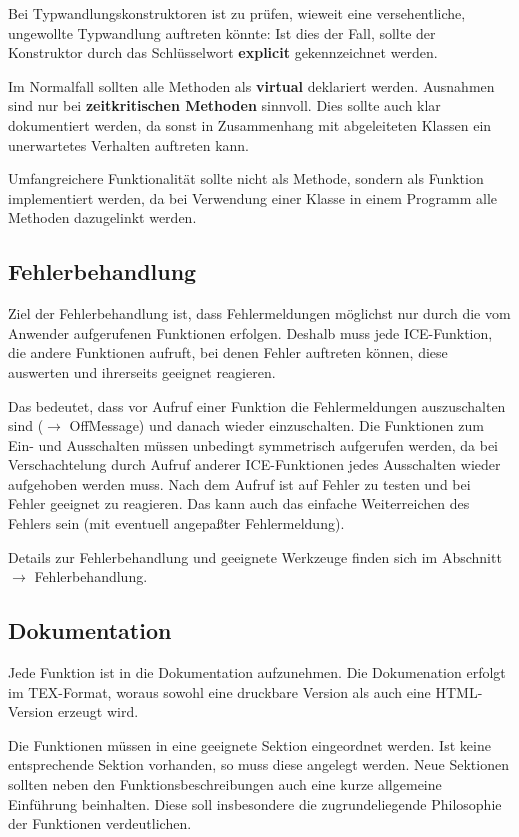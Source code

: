 \documentclass[10pt,titlepage]{article}
\def\see#1{$\to$ #1}
\begin{document}
{{Bei Typwandlungskonstruktoren ist zu prüfen, wieweit eine versehentliche,
ungewollte Typwandlung auftreten könnte: Ist dies der Fall, sollte der 
Konstruktor durch das Schlüsselwort {\bf explicit} gekennzeichnet werden.

Im Normalfall sollten alle Methoden als {\bf virtual} deklariert
werden. Ausnahmen sind nur bei {\bf zeitkritischen Methoden}
sinnvoll. Dies sollte auch klar dokumentiert werden, da sonst in 
Zusammenhang mit abgeleiteten Klassen ein unerwartetes Verhalten 
auftreten kann.

Umfangreichere Funktionalität sollte nicht als Methode, sondern als Funktion
implementiert werden, da bei Verwendung einer Klasse in einem Programm alle
Methoden dazugelinkt werden.

\subsection{Fehlerbehandlung}
Ziel der Fehlerbehandlung ist, dass Fehlermeldungen möglichst nur durch die
vom Anwender aufgerufenen Funktionen erfolgen. Deshalb muss jede ICE-Funktion,
die andere Funktionen aufruft, bei denen Fehler auftreten können, diese
auswerten und ihrerseits geeignet reagieren.

Das bedeutet, dass vor Aufruf einer Funktion die Fehlermeldungen auszuschalten
sind (\see{OffMessage}) und danach wieder einzuschalten. Die Funktionen zum
Ein- und Ausschalten müssen unbedingt symmetrisch aufgerufen werden, da bei 
Verschachtelung durch Aufruf anderer ICE-Funktionen jedes Ausschalten 
wieder aufgehoben werden muss. 
Nach dem Aufruf ist auf Fehler zu testen und bei Fehler geeignet zu 
reagieren. Das kann auch das einfache Weiterreichen des Fehlers sein 
(mit eventuell angepaßter Fehlermeldung).

Details zur Fehlerbehandlung und geeignete Werkzeuge finden sich im Abschnitt
\see{Fehlerbehandlung}.

\subsection{Dokumentation}
Jede Funktion ist in die Dokumentation aufzunehmen. Die Dokumenation erfolgt
im TEX-Format, woraus sowohl eine druckbare Version als auch eine HTML-Version
erzeugt wird.

Die Funktionen müssen in eine geeignete Sektion eingeordnet werden. Ist keine
entsprechende Sektion vorhanden, so muss diese angelegt werden. Neue Sektionen
sollten neben den Funktionsbeschreibungen auch eine kurze allgemeine Einführung
beinhalten. Diese soll insbesondere die zugrundeliegende Philosophie der
Funktionen verdeutlichen.

}}
\end{document}
